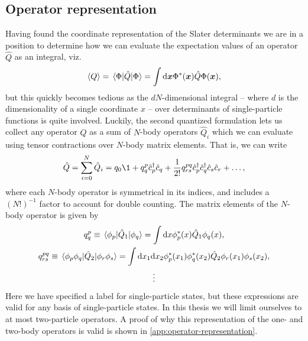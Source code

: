         \subsection{Operator representation}
            Having found the coordinate representation of the Slater
            determinants we are in a position to determine how we can evaluate
            the expectation values of an operator $\hat{Q}$ as an integral, viz.
            \begin{align}
                \expval{Q}
                = \mel*{\Phi}{\hat{Q}}{\Phi}
                = \int\dd\boldsymbol{x}\Phi^{*}(\boldsymbol{x})\hat{Q}\Phi(\boldsymbol{x}),
            \end{align}
            but this quickly becomes tedious as the $dN$-dimensional integral --
            where $d$ is the dimensionality of a single coordinate $x$ -- over
            determinants of single-particle functions is quite involved.
            Luckily, the second quantized formulation lets us collect any
            operator $\hat{Q}$ as a sum of $N$-body operators $\hat{Q}_i$ which
            we can evaluate using tensor contractions over $N$-body matrix
            elements.
            That is, we can write
            \begin{align}
                \hat{Q}
                = \sum_{i = 0}^{N}
                \hat{Q}_i
                = q_0\1
                + q^{p}_{q}\ccr{p}\can{q}
                + \frac{1}{2!}
                q^{pq}_{rs}\ccr{p}\ccr{q}\can{s}\can{r}
                + \dots,
                \label{eq:many-body-operator}
            \end{align}
            where each $N$-body operator is symmetrical in its indices, and includes
            a $(N!)^{-1}$ factor to account for double counting.
            The matrix elements of the $N$-body operator is given by
            \begin{gather}
                q^{p}_{q}
                \equiv
                \mel*{\phi_p}{\hat{Q}_1}{\phi_q}
                = \int\dd x \phi^{*}_{p}(x)\hat{Q}_1\phi_q(x),
                \\
                q^{pq}_{rs}
                \equiv
                \mel*{\phi_p\phi_q}{\hat{Q}_2}{\phi_r\phi_s}
                =
                \int\dd x_1\dd x_2
                \phi^{*}_{p}(x_1)\phi^{*}_{q}(x_2)
                \hat{Q}_2
                \phi_r(x_1)
                \phi_s(x_2),
                \\
                \vdots
            \end{gather}
            Here we have specified a label for single-particle states, but
            these expressions are valid for any basis of single-particle states.
            In this thesis we will limit ourselves to at most two-particle
            operators.
            A proof of why this representation of the one- and two-body
            operators is valid is shown in
            \autoref{app:operator-representation}.

